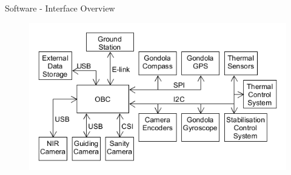\documentclass[11pt, aspectratio=169]{beamer}
\begin{document}
{
\begin{frame}[plain]
\label{slide:questions}
\end{frame}

}


\begin{frame}[c]{Software - Interface Overview}
    \begin{figure}
        \includegraphics[height=\textheight]{software/process-overview.png}
    \end{figure}
\end{frame}
\end{document}

